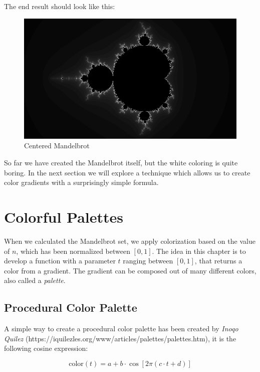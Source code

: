 \documentclass[11pt]{article}
\makeatletter
\def\maxwidth{\ifdim\Gin@nat@width>\linewidth\linewidth
    \else\Gin@nat@width\fi}
\let\Oldincludegraphics\includegraphics
\renewcommand{\includegraphics}[1]{\Oldincludegraphics[width=.8\maxwidth]{#1}}
\makeatother
\begin{document}
    The end result should look like this:

    \begin{figure}[h]
\centering
\includegraphics{img/mandelbrot-centered.png}
\caption{Centered Mandelbrot}
\end{figure}

    So far we have created the Mandelbrot itself, but the white coloring is
quite boring. In the next section we will explore a technique which
allows us to create color gradients with a surprisingly simple formula.

    \hypertarget{colorful-palettes}{%
\section{Colorful Palettes}\label{colorful-palettes}}

    When we calculated the Mandelbrot set, we apply colorization based on
the value of \(n\), which has been normalized between \([0,1]\). The
idea in this chapter is to develop a function with a parameter \(t\)
ranging between \([0,1]\), that returns a color from a gradient. The
gradient can be composed out of many different colors, also called a
\emph{palette}.

    \hypertarget{procedural-color-palette}{%
\subsection{Procedural Color Palette}\label{procedural-color-palette}}

    A simple way to create a procedural color palette has been created by
\emph{Inoqo Quilez}
(https://iquilezles.org/www/articles/palettes/palettes.htm), it is the
following cosine expression:

    \[ \textrm{color}(t) = a + b \cdot \cos [2\pi(c\cdot t+d)] \]
\end{document}

